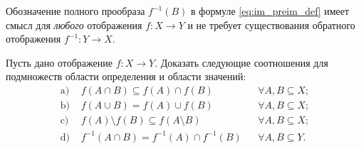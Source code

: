\begin{remark}
    Обозначение полного прообраза $f^{-1}(B)$ в формуле \eqref{eq:im_preim_def} 
    имеет смысл для \emph{любого} отображения $f: X \to Y$ и не требует 
    существования обратного отображения $f^{-1}: Y \to X$.
\end{remark}

\begin{problem}
    Пусть дано отображение $f: X \to Y$. Доказать следующие соотношения для 
    подмножеств области определения и области значений:
    \begin{align}
        \text{a) } & f(A \cap B) \subseteq f(A) \cap f(B) 
        && \forall A, B \subseteq X; \label{eq:im_cap} \tag{5} \\
        \text{b) } & f(A \cup B) = f(A) \cup f(B) 
        && \forall A, B \subseteq X; \label{eq:im_cup} \tag{6} \\
        \text{c) } & f(A) \setminus f(B) \subseteq f(A \setminus B) 
        && \forall A, B \subseteq X; \label{eq:im_diff} \tag{7} \\
        \text{d) } & f^{-1}(A \cap B) = f^{-1}(A) \cap f^{-1}(B) 
        && \forall A, B \subseteq Y. \label{eq:preim_cap} \tag{8}
    \end{align}
\end{problem}

